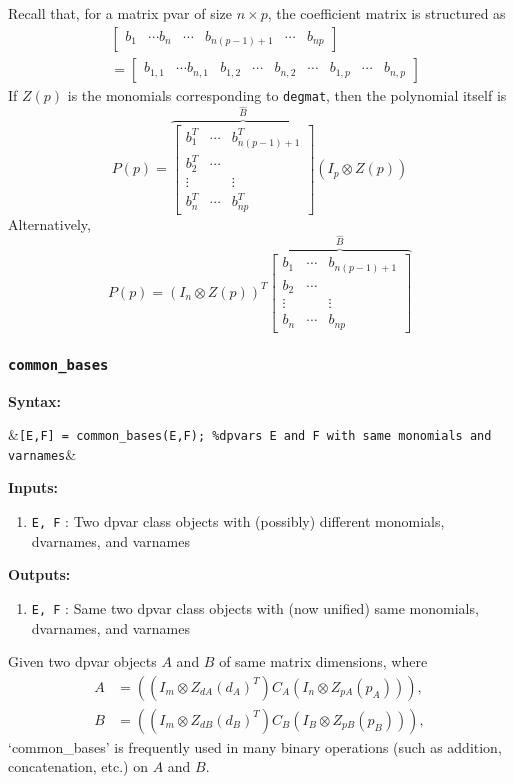 \documentclass{article}
\newcommand{\bmat}[1]{\begin{bmatrix} #1\end{bmatrix}}
\begin{document}
	Recall that, for a matrix pvar of size $n \times p$, the coefficient matrix is structured as
	\begin{align*}
		&\bmat{b_1 & \cdots b_n& \cdots &b_{n(p-1)+1}& \cdots & b_{np}}\\
		&=\bmat{b_{1,1} & \cdots b_{n,1}&b_{1,2}& \cdots &b_{n,2}&\cdots&b_{1,p}& \cdots & b_{n,p}}
	\end{align*}
	If $Z(p)$ is the monomials corresponding to \texttt{degmat}, then the polynomial itself is
	\[
	P(p)= \overbrace{\bmat{b_1^T & \cdots & b_{n(p-1)+1}^T\\
			b_2^T & \cdots & \\
			\vdots & & \vdots \\
			b_n^T & \cdots & b_{np}^T}}^{\hat B}(I_p \otimes Z(p))
	\]
	Alternatively,
	\[
	P(p)= (I_n \otimes  Z(p))^T \overbrace{\bmat{b_1 & \cdots & b_{n(p-1)+1}\\
			b_2 & \cdots & \\
			\vdots & & \vdots \\
			b_n & \cdots & b_{np}}}^{\hat B}
	\]
	
	\subsubsection{\texttt{common\_bases}}\label{subsec:common-bases}
	\textbf{Syntax:}
		\begin{flalign*}
			&\texttt{[E,F] = common\_bases(E,F); \%dpvars E and F with same monomials and varnames}&
		\end{flalign*}
	\textbf{Inputs:}
	\begin{enumerate}
		\item \texttt{E, F} : Two dpvar class objects with (possibly) different monomials, dvarnames, and varnames
	\end{enumerate}
	\textbf{Outputs:}
	\begin{enumerate}
		\item \texttt{E, F} : Same two dpvar class objects with (now unified) same monomials, dvarnames, and varnames
	\end{enumerate}

	Given two dpvar objects $A$ and $B$ of same matrix dimensions, where
	\begin{align*}
		A &= \left((I_m \otimes  Z_{dA}(d_A)^T) C_A (I_n \otimes Z_{pA}(p_A))\right),\\
		B &= \left((I_m \otimes  Z_{dB}(d_B)^T) C_B (I_B \otimes Z_{pB}(p_B))\right),
	\end{align*}
	`common\_bases' is frequently used in many binary operations (such as addition, concatenation, etc.) on $A$ and $B$.
	
\end{document}
